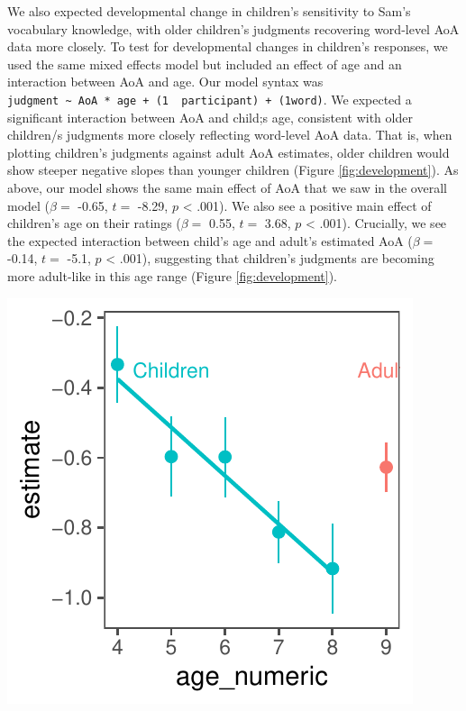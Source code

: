 \documentclass[10pt, letterpaper]{article}
\newenvironment{CodeChunk}{}{}
\begin{document}
We also expected developmental change in children's sensitivity to Sam's
vocabulary knowledge, with older children's judgments recovering
word-level AoA data more closely. To test for developmental changes in
children's responses, we used the same mixed effects model but included
an effect of age and an interaction between AoA and age. Our model
syntax was
\texttt{judgment\ \textasciitilde{}\ AoA\ *\ age\ +\ (1\ \textbar{}\ participant)\ +\ (1\textbar{}word)}.
We expected a significant interaction between AoA and child;s age,
consistent with older children/s judgments more closely reflecting
word-level AoA data. That is, when plotting children's judgments against
adult AoA estimates, older children would show steeper negative slopes
than younger children (Figure \ref{fig:development}). As above, our
model shows the same main effect of AoA that we saw in the overall model
(\(\beta =\) -0.65, \(t =\) -8.29, \(p\) \textless{} .001). We also see
a positive main effect of children's age on their ratings (\(\beta =\)
0.55, \(t =\) 3.68, \(p\) \textless{} .001). Crucially, we see the
expected interaction between child's age and adult's estimated AoA
(\(\beta =\) -0.14, \(t =\) -5.1, \(p\) \textless{} .001), suggesting
that children's judgments are becoming more adult-like in this age range
(Figure \ref{fig:development}).

\begin{CodeChunk}

\includegraphics{figs/unnamed-chunk-8-1} \end{CodeChunk}
\end{document}
